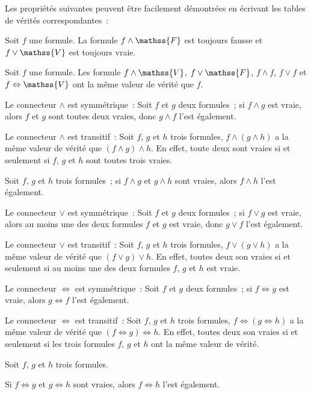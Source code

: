 Les propriétés suivantes peuvent être facilement démontrées en écrivant les tables de vérités correspondantes :
\startitemize
  \item Soit $f$ une formule. La formule $f \wedge \mathss{F}$ est toujours fausse et $f \vee \mathss{V}$ est toujours vraie.
  \item Soit $f$ une formule. Les formule $f \wedge \mathss{V}$, $f \vee \mathss{F}$, $f \wedge f$, $f \vee f$ et $f \Leftrightarrow \mathss{V}$ ont la même valeur de vérité que $f$.
  \item Le connecteur $\wedge$ est symmétrique : Soit $f$ et $g$ deux formules ; si $f \wedge g$ est vraie, alors $f$ et $g$ sont toutes deux vraies, donc $g \wedge f$ l'est également.
  \item Le connecteur $\wedge$ est transitif : Soit $f$, $g$ et $h$ trois formules, $f \wedge (g \wedge h)$ a la même valeur de vérité que $(f \wedge g) \wedge h$. En effet, toute deux sont vraies si et seulement si $f$, $g$ et $h$ sont toutes trois vraies.
  \item Soit $f$, $g$ et $h$ trois formules ; si $f \wedge g$ et $g \wedge h$ sont vraies, alors $f \wedge h$ l'est également.
  \item Le connecteur $\vee$ est symmétrique : Soit $f$ et $g$ deux formules ; si $f \vee g$ est vraie, alors au moins une des deux formules $f$ et $g$ est vraie, donc $g \vee f$ l'est également.
  \item Le connecteur $\vee$ est transitif : Soit $f$, $g$ et $h$ trois formules, $f \vee (g \vee h)$ a la même valeur de vérité que $(f \vee g) \vee h$. En effet, toutes deux son vraies si et seulement si au moins une des deux formules $f$, $g$ et $h$ est vraie.
  \item Le connecteur $\Leftrightarrow$ est symmétrique : Soit $f$ et $g$ deux formules ; si $f \Leftrightarrow g$ est vraie, alors $g \Leftrightarrow f$ l'est également.
  \item Le connecteur $\Leftrightarrow$ est transitif : Soit $f$, $g$ et $h$ trois formules, $f \Leftrightarrow (g \Leftrightarrow h)$ a la même valeur de vérité que $(f \Leftrightarrow g) \Leftrightarrow h$. En effet, toutes deux son vraies si et seulement si les trois formules $f$, $g$ et $h$ ont la même valeur de vérité.
  \item Soit $f$, $g$ et $h$ trois formules. 
      \startitemize[nowhite]
          \item Si $f \Leftrightarrow g$ et $g \Leftrightarrow h$ sont vraies, alors $f \Leftrightarrow h$ l'est également. 
